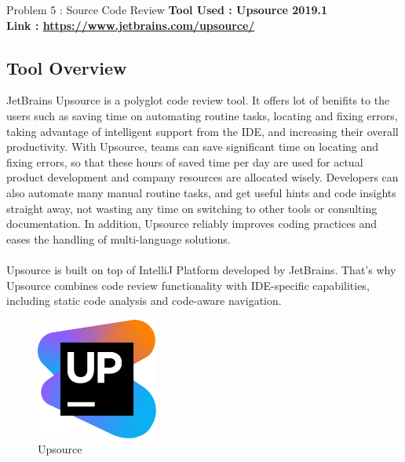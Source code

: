 \documentclass[a4paper,12pt]{article}
\begin{document}
\begin{section}{Problem 5 : Source Code Review}
	\large \textbf{Tool Used : Upsource 2019.1} \\  \vspace{0.5cm} 
	\large \textbf{Link : \url{https://www.jetbrains.com/upsource/}}


\subsection{Tool Overview}
JetBrains Upsource is a polyglot code review tool. It offers lot of benifits to the users such as saving time on automating routine tasks, locating and fixing errors, taking advantage of intelligent support from the IDE, and increasing their overall productivity. With Upsource, teams can save significant time on locating and fixing errors, so that these hours of saved time per day are used for actual product development and company resources are allocated wisely. Developers can also automate many manual routine tasks, and get useful hints and code insights straight away, not wasting any time on switching to other tools or consulting documentation. In addition, Upsource reliably improves coding practices and eases the handling of multi-language solutions. \\ \\ 
Upsource is built on top of IntelliJ Platform developed by JetBrains. That’s why Upsource combines code review functionality with IDE-specific capabilities, including static code analysis and code-aware navigation.
\\

\begin{figure}[htp]
	\centering
	\includegraphics[width=4cm]{Upsource_logo.jpg}
	\caption{Upsource}
	\label{fig:galaxy}
\end{figure}


\end{section}


\newpage
\end{document}
